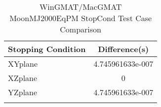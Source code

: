 \begin{table}[htbp!]
\centering
\caption{ WinGMAT/MacGMAT MoonMJ2000EqPM StopCond Test Case Comparison}
      \begin{tabular}{lc}
      \hline\hline
          Stopping Condition & Difference(s) \\
         \hline
         XYplane & 4.745961633e-007 \\
         XZplane & 0 \\
         YZplane & 4.745961633e-007 \\
      \hline\hline
      \label{Table: WinGMAT-MacGMAT MoonMJ2000EqPM StopCond Table} 
\end{tabular}
\end{table}
